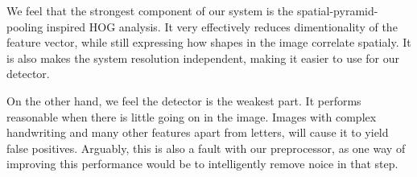 \documentclass[paper=a4, fontsize=11pt]{scrartcl} %
\numberwithin{equation}{section} %
\numberwithin{figure}{section} %
\numberwithin{table}{section} %
\begin{document}
We feel that the strongest component of our system is the spatial-pyramid-pooling inspired HOG analysis.
It very effectively reduces dimentionality of the feature vector, while still expressing how shapes in the image correlate spatialy.
It is also makes the system resolution independent, making it easier to use for our detector.

On the other hand, we feel the detector is the weakest part.
It performs reasonable when there is little going on in the image.
Images with complex handwriting and many other features apart from letters, will cause it to yield false positives.
Arguably, this is also a fault with our preprocessor, as one way of improving this performance would be to intelligently remove noice in that step.



 
\end{document}
